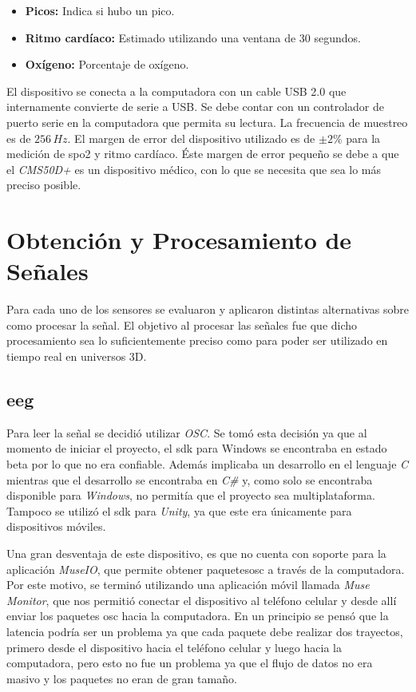 \begin{itemize}
\item \textbf{Picos:}  Indica si hubo un pico.
\item \textbf{Ritmo cardíaco:} Estimado utilizando una ventana de 30 segundos.
\item \textbf{Oxígeno:} Porcentaje de oxígeno.
\end{itemize} 

El dispositivo se conecta a la computadora con un cable USB 2.0 que internamente convierte de serie a USB. Se debe contar con un controlador de puerto serie en la computadora que permita su lectura. La frecuencia de muestreo es de $256 \, Hz$. El margen de error del dispositivo utilizado es de $\pm2\%$ para la medición de \acrshort{spo2} y ritmo cardíaco. Éste margen de error pequeño se debe a que el \emph{CMS50D+} es un dispositivo médico, con lo que se necesita que sea lo más preciso posible.

\section{Obtención y Procesamiento de Señales}

Para cada uno de los sensores se evaluaron y aplicaron distintas alternativas sobre como procesar la señal. El objetivo al procesar las señales fue que dicho procesamiento sea lo suficientemente preciso como para poder ser utilizado en tiempo real en universos 3D.

\subsection{\acrshort{eeg}} \label{sec:eeg-signal-processing}

Para leer la señal se decidió utilizar \emph{OSC}. Se tomó esta decisión ya que al momento de iniciar el proyecto, el \acrshort{sdk} para Windows se encontraba en estado beta por lo que no era confiable. Además implicaba un desarrollo en el lenguaje \emph{C} mientras que el desarrollo se encontraba en \emph{C\#} y, como solo se encontraba disponible para \emph{Windows}, no permitía que el proyecto sea multiplataforma. Tampoco se utilizó el \acrshort{sdk} para \emph{Unity}, ya que este era únicamente para dispositivos móviles.

Una gran desventaja de este dispositivo, es que no cuenta con soporte para la aplicación \emph{MuseIO}, que permite obtener paquetes\acrshort{osc} a través de la computadora. Por este motivo, se terminó utilizando una aplicación móvil llamada \emph{Muse Monitor}, que nos permitió conectar el dispositivo al teléfono celular y desde allí enviar los paquetes \acrshort{osc} hacia la computadora. En un principio se pensó que la latencia podría ser un problema ya que cada paquete debe realizar dos trayectos, primero desde el dispositivo hacia el teléfono celular y luego hacia la computadora, pero esto no fue un problema ya que el flujo de datos no era masivo y los paquetes no eran de gran tamaño.

